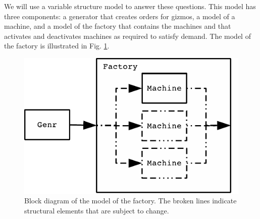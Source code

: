 We will use a variable structure model to answer these questions. This model has three components: a generator that creates orders for gizmos, a model of a machine, and a model of the factory that contains the machines and that activates and deactivates machines as required to satisfy demand. The model of the factory is illustrated in Fig. \ref{fig:factory_model}.
\begin{figure}[ht]
\centering
\includegraphics{var_struct_models_figs/factory_block_diagram.pdf}
\caption{Block diagram of the model of the factory. The broken lines indicate structural elements that are subject to change.}
\label{fig:factory_model}
\end{figure}

